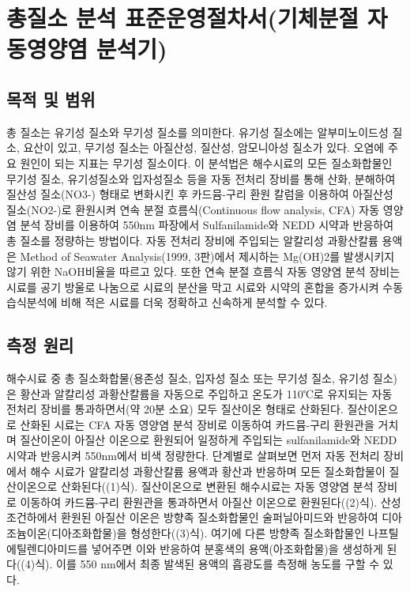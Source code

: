 \documentclass[
]{book}
\begin{document}
\hypertarget{uxcd1duxc9c8uxc18c-uxbd84uxc11d-uxd45cuxc900uxc6b4uxc601uxc808uxcc28uxc11cuxae30uxccb4uxbd84uxc808-uxc790uxb3d9uxc601uxc591uxc5fc-uxbd84uxc11duxae30}{%
\chapter{총질소 분석 표준운영절차서(기체분절 자동영양염 분석기)}\label{uxcd1duxc9c8uxc18c-uxbd84uxc11d-uxd45cuxc900uxc6b4uxc601uxc808uxcc28uxc11cuxae30uxccb4uxbd84uxc808-uxc790uxb3d9uxc601uxc591uxc5fc-uxbd84uxc11duxae30}}

\hypertarget{uxbaa9uxc801-uxbc0f-uxbc94uxc704-4}{%
\section{목적 및 범위}\label{uxbaa9uxc801-uxbc0f-uxbc94uxc704-4}}

총 질소는 유기성 질소와 무기성 질소를 의미한다. 유기성 질소에는 알부미노이드성 질소, 요산이 있고, 무기성 질소는 아질산성, 질산성, 암모니아성 질소가 있다. 오염에 주요 원인이 되는 지표는 무기성 질소이다. 이 분석법은 해수시료의 모든 질소화합물인 무기성 질소, 유기성질소와 입자성질소 등을 자동 전처리 장비를 통해 산화, 분해하여 질산성 질소(NO3-) 형태로 변화시킨 후 카드뮴-구리 환원 칼럼을 이용하여 아질산성 질소(NO2-)로 환원시켜 연속 분절 흐름식(Continuous flow analysis, CFA) 자동 영양염 분석 장비를 이용하여 550nm 파장에서 Sulfanilamide와 NEDD 시약과 반응하여 총 질소를 정량하는 방법이다. 자동 전처리 장비에 주입되는 알칼리성 과황산칼륨 용액은 Method of Seawater Analysis(1999, 3판)에서 제시하는 Mg(OH)2를 발생시키지 않기 위한 NaOH비율을 따르고 있다. 또한 연속 분절 흐름식 자동 영양염 분석 장비는 시료를 공기 방울로 나눔으로 시료의 분산을 막고 시료와 시약의 혼합을 증가시켜 수동 습식분석에 비해 적은 시료를 더욱 정확하고 신속하게 분석할 수 있다.

\hypertarget{uxce21uxc815-uxc6d0uxb9ac-2}{%
\section{측정 원리}\label{uxce21uxc815-uxc6d0uxb9ac-2}}

해수시료 중 총 질소화합물(용존성 질소, 입자성 질소 또는 무기성 질소, 유기성 질소)은 황산과 알칼리성 과황산칼륨을 자동으로 주입하고 온도가 110℃로 유지되는 자동 전처리 장비를 통과하면서(약 20분 소요) 모두 질산이온 형태로 산화된다. 질산이온으로 산화된 시료는 CFA 자동 영양염 분석 장비로 이동하여 카드뮴-구리 환원관을 거치며 질산이온이 아질산 이온으로 환원되어 일정하게 주입되는 sulfanilamide와 NEDD 시약과 반응시켜 550nm에서 비색 정량한다.
단계별로 살펴보면 먼저 자동 전처리 장비에서 해수 시료가 알칼리성 과황산칼륨 용액과 황산과 반응하며 모든 질소화합물이 질산이온으로 산화된다((1)식). 질산이온으로 변환된 해수시료는 자동 영양염 분석 장비로 이동하여 카드뮴-구리 환원관을 통과하면서 아질산 이온으로 환원된다((2)식). 산성 조건하에서 환원된 아질산 이온은 방향족 질소화합물인 술퍼닐아미드와 반응하여 디아조늄이온(디아조화합물)을 형성한다((3)식). 여기에 다른 방향족 질소화합물인 나프틸에틸렌디아미드를 넣어주면 이와 반응하여 분홍색의 용액(아조화합물)을 생성하게 된다((4)식). 이를 550 nm에서 최종 발색된 용액의 흡광도를 측정해 농도를 구할 수 있다.
\end{document}
